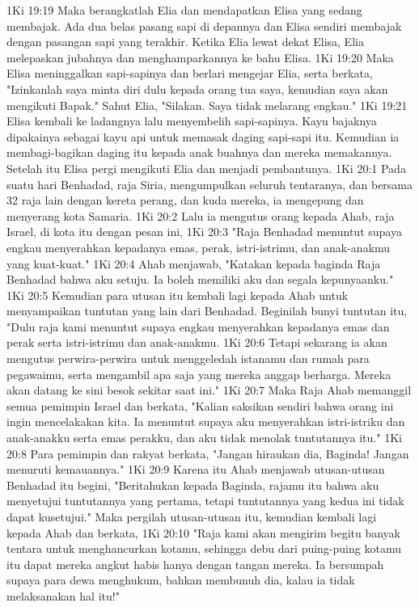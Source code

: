 1Ki 19:19  Maka berangkatlah Elia dan mendapatkan Elisa yang sedang membajak. Ada dua belas pasang sapi di depannya dan Elisa sendiri membajak dengan pasangan sapi yang terakhir. Ketika Elia lewat dekat Elisa, Elia melepaskan jubahnya dan menghamparkannya ke bahu Elisa.
1Ki 19:20  Maka Elisa meninggalkan sapi-sapinya dan berlari mengejar Elia, serta berkata, "Izinkanlah saya minta diri dulu kepada orang tua saya, kemudian saya akan mengikuti Bapak." Sahut Elia, "Silakan. Saya tidak melarang engkau."
1Ki 19:21  Elisa kembali ke ladangnya lalu menyembelih sapi-sapinya. Kayu bajaknya dipakainya sebagai kayu api untuk memasak daging sapi-sapi itu. Kemudian ia membagi-bagikan daging itu kepada anak buahnya dan mereka memakannya. Setelah itu Elisa pergi mengikuti Elia dan menjadi pembantunya.
1Ki 20:1  Pada suatu hari Benhadad, raja Siria, mengumpulkan seluruh tentaranya, dan bersama 32 raja lain dengan kereta perang, dan kuda mereka, ia mengepung dan menyerang kota Samaria.
1Ki 20:2  Lalu ia mengutus orang kepada Ahab, raja Israel, di kota itu dengan pesan ini,
1Ki 20:3  "Raja Benhadad menuntut supaya engkau menyerahkan kepadanya emas, perak, istri-istrimu, dan anak-anakmu yang kuat-kuat."
1Ki 20:4  Ahab menjawab, "Katakan kepada baginda Raja Benhadad bahwa aku setuju. Ia boleh memiliki aku dan segala kepunyaanku."
1Ki 20:5  Kemudian para utusan itu kembali lagi kepada Ahab untuk menyampaikan tuntutan yang lain dari Benhadad. Beginilah bunyi tuntutan itu, "Dulu raja kami menuntut supaya engkau menyerahkan kepadanya emas dan perak serta istri-istrimu dan anak-anakmu.
1Ki 20:6  Tetapi sekarang ia akan mengutus perwira-perwira untuk menggeledah istanamu dan rumah para pegawaimu, serta mengambil apa saja yang mereka anggap berharga. Mereka akan datang ke sini besok sekitar saat ini."
1Ki 20:7  Maka Raja Ahab memanggil semua pemimpin Israel dan berkata, "Kalian saksikan sendiri bahwa orang ini ingin mencelakakan kita. Ia menuntut supaya aku menyerahkan istri-istriku dan anak-anakku serta emas perakku, dan aku tidak menolak tuntutannya itu."
1Ki 20:8  Para pemimpin dan rakyat berkata, "Jangan hiraukan dia, Baginda! Jangan menuruti kemauannya."
1Ki 20:9  Karena itu Ahab menjawab utusan-utusan Benhadad itu begini, "Beritahukan kepada Baginda, rajamu itu bahwa aku menyetujui tuntutannya yang pertama, tetapi tuntutannya yang kedua ini tidak dapat kusetujui." Maka pergilah utusan-utusan itu, kemudian kembali lagi kepada Ahab dan berkata,
1Ki 20:10  "Raja kami akan mengirim begitu banyak tentara untuk menghancurkan kotamu, sehingga debu dari puing-puing kotamu itu dapat mereka angkut habis hanya dengan tangan mereka. Ia bersumpah supaya para dewa menghukum, bahkan membunuh dia, kalau ia tidak melaksanakan hal itu!"
